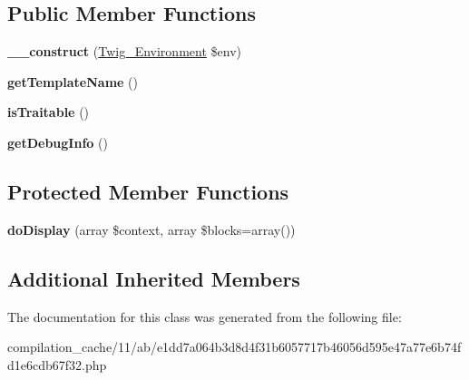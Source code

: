 \subsection*{Public Member Functions}
\begin{DoxyCompactItemize}
\item 
\hypertarget{class_____twig_template__11abe1dd7a064b3d8d4f31b6057717b46056d595e47a77e6b74fd1e6cdb67f32_a4f8326243132c1450a81e0a817aa1be7}{}{\bfseries \+\_\+\+\_\+construct} (\hyperlink{class_twig___environment}{Twig\+\_\+\+Environment} \$env)\label{class_____twig_template__11abe1dd7a064b3d8d4f31b6057717b46056d595e47a77e6b74fd1e6cdb67f32_a4f8326243132c1450a81e0a817aa1be7}

\item 
\hypertarget{class_____twig_template__11abe1dd7a064b3d8d4f31b6057717b46056d595e47a77e6b74fd1e6cdb67f32_a621a3ccd148ed8b9e937da6959c98f39}{}{\bfseries get\+Template\+Name} ()\label{class_____twig_template__11abe1dd7a064b3d8d4f31b6057717b46056d595e47a77e6b74fd1e6cdb67f32_a621a3ccd148ed8b9e937da6959c98f39}

\item 
\hypertarget{class_____twig_template__11abe1dd7a064b3d8d4f31b6057717b46056d595e47a77e6b74fd1e6cdb67f32_aa9eb89be270f6afc256ef5e272b78a63}{}{\bfseries is\+Traitable} ()\label{class_____twig_template__11abe1dd7a064b3d8d4f31b6057717b46056d595e47a77e6b74fd1e6cdb67f32_aa9eb89be270f6afc256ef5e272b78a63}

\item 
\hypertarget{class_____twig_template__11abe1dd7a064b3d8d4f31b6057717b46056d595e47a77e6b74fd1e6cdb67f32_abd0ecb0136f4228db2bd963bfc1e20d7}{}{\bfseries get\+Debug\+Info} ()\label{class_____twig_template__11abe1dd7a064b3d8d4f31b6057717b46056d595e47a77e6b74fd1e6cdb67f32_abd0ecb0136f4228db2bd963bfc1e20d7}

\end{DoxyCompactItemize}
\subsection*{Protected Member Functions}
\begin{DoxyCompactItemize}
\item 
\hypertarget{class_____twig_template__11abe1dd7a064b3d8d4f31b6057717b46056d595e47a77e6b74fd1e6cdb67f32_adb62b7c226e07d30f836ed16158d924f}{}{\bfseries do\+Display} (array \$context, array \$blocks=array())\label{class_____twig_template__11abe1dd7a064b3d8d4f31b6057717b46056d595e47a77e6b74fd1e6cdb67f32_adb62b7c226e07d30f836ed16158d924f}

\end{DoxyCompactItemize}
\subsection*{Additional Inherited Members}


The documentation for this class was generated from the following file\+:\begin{DoxyCompactItemize}
\item 
compilation\+\_\+cache/11/ab/e1dd7a064b3d8d4f31b6057717b46056d595e47a77e6b74fd1e6cdb67f32.\+php\end{DoxyCompactItemize}
